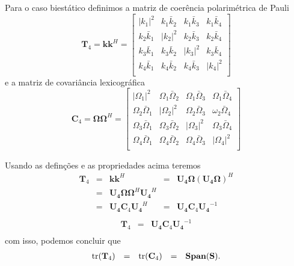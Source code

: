 Para o caso biestático definimos a matriz de coerência polarimétrica de Pauli 
\begin{equation}\label{matriz_polar_pauli}
	\mathbf{T}_4=\mathbf{k}\mathbf{k}^H=	
\left[
\begin{array}{rrrr}
	|k_1|^2       & k_1\bar{k}_2  & k_1\bar{k}_3  & k_1\bar{k}_4  \\
	k_2\bar{k}_1  & |k_2|^2       & k_2\bar{k}_3  & k_2\bar{k}_4  \\
	k_3\bar{k}_1  & k_3\bar{k}_2  &    |k_3|^2    & k_3\bar{k}_4  \\
	k_4\bar{k}_1  & k_4\bar{k}_2  & k_4\bar{k}_3  & |k_4|^2   \\
\end{array}
\right]
\end{equation}
e a matriz de covariância lexicográfica
\begin{equation}\label{matriz_covar_lexic}
	\mathbf{C}_4=\mathbf{\Omega}\mathbf{\Omega}^H=	
\left[
\begin{array}{rrrr}
	|\Omega_1|^2       & \Omega_1\bar{\Omega}_2  & \Omega_1\bar{\Omega}_3  & \Omega_1\bar{\Omega}_4  \\
	\Omega_2\bar{\Omega}_1  & |\Omega_2|^2       & \Omega_2\bar{\Omega}_3  & \omega_2\bar{\Omega}_4  \\
	\Omega_3\bar{\Omega}_1  & \Omega_3\bar{\Omega}_2  &    |\Omega_3|^2    & \Omega_3\bar{\Omega}_4  \\
	\Omega_4\bar{\Omega}_1  & \Omega_4\bar{\Omega}_2  & \Omega_4\bar{\Omega}_3  & |\Omega_4|^2   \\
\end{array}
\right]
\end{equation}

Usando as definções e as propriedades acima teremos
\begin{equation}\nonumber
\begin{array}{rrrrr}
	\mathbf{T}_4&=&\mathbf{k}\mathbf{k}^H&=&\mathbf{U_4\Omega}(\mathbf{U_4\Omega})^H	\\
	   &=&\mathbf{U_4\Omega}\mathbf{\Omega}^H\mathbf{U_4}^H&&	\\
	   &=&\mathbf{U_4}\mathbf{C}_4\mathbf{U_4}^H&=&\mathbf{U_4}\mathbf{C}_4\mathbf{U_4}^{-1}\\
\end{array}
\end{equation}
\begin{equation}\label{matriz_simil_t4_c4}
\begin{array}{rrr}
	 \mathbf{T}_4  &=&\mathbf{U_4}\mathbf{C}_4\mathbf{U_4}^{-1}\\
\end{array}
\end{equation}
com isso, podemos concluir que
\begin{equation}\label{traco_t4_c4}
\begin{array}{rrrrr}
	\operatorname{tr}({\mathbf{T}_4})  &=&\operatorname{tr}({\mathbf{C}_4})&=&\mathbf{Span(S)}.\\
\end{array}
\end{equation}

